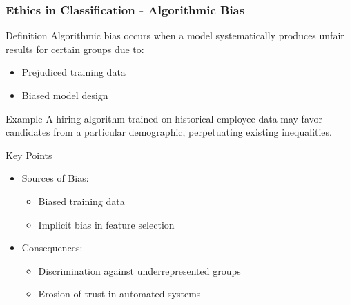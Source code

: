 \documentclass[aspectratio=169]{beamer}
\begin{document}
\begin{frame}[fragile]
    \frametitle{Ethics in Classification - Algorithmic Bias}
    \begin{block}{Definition}
        Algorithmic bias occurs when a model systematically produces unfair results for certain groups due to:
        \begin{itemize}
            \item Prejudiced training data
            \item Biased model design
        \end{itemize}
    \end{block}
    
    \begin{block}{Example}
        A hiring algorithm trained on historical employee data may favor candidates from a particular demographic, perpetuating existing inequalities.
    \end{block}
    
    \begin{block}{Key Points}
        \begin{itemize}
            \item Sources of Bias:
                \begin{itemize}
                    \item Biased training data
                    \item Implicit bias in feature selection
                \end{itemize}
            \item Consequences:
                \begin{itemize}
                    \item Discrimination against underrepresented groups
                    \item Erosion of trust in automated systems
                \end{itemize}
        \end{itemize}
    \end{block}
\end{frame}
\end{document}
